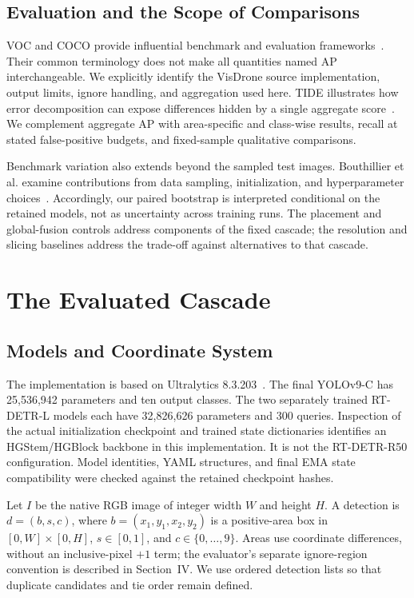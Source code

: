 \documentclass[journal]{IEEEtran}
\begin{document}
\subsection{Evaluation and the Scope of Comparisons}
VOC and COCO provide influential benchmark and evaluation frameworks~\cite{everingham2010voc,lin2014coco}. Their common terminology does not make all quantities named AP interchangeable. We explicitly identify the VisDrone source implementation, output limits, ignore handling, and aggregation used here. TIDE illustrates how error decomposition can expose differences hidden by a single aggregate score~\cite{bolya2020tide}. We complement aggregate AP with area-specific and class-wise results, recall at stated false-positive budgets, and fixed-sample qualitative comparisons.

Benchmark variation also extends beyond the sampled test images. Bouthillier et al. examine contributions from data sampling, initialization, and hyperparameter choices~\cite{bouthillier2021variance}. Accordingly, our paired bootstrap is interpreted conditional on the retained models, not as uncertainty across training runs. The placement and global-fusion controls address components of the fixed cascade; the resolution and slicing baselines address the trade-off against alternatives to that cascade.

\section{The Evaluated Cascade}
\subsection{Models and Coordinate System}
The implementation is based on Ultralytics 8.3.203~\cite{ultralytics2025}. The final YOLOv9-C has 25,536,942 parameters and ten output classes. The two separately trained RT-DETR-L models each have 32,826,626 parameters and 300 queries. Inspection of the actual initialization checkpoint and trained state dictionaries identifies an HGStem/HGBlock backbone in this implementation. It is not the RT-DETR-R50 configuration. Model identities, YAML structures, and final EMA state compatibility were checked against the retained checkpoint hashes.

Let $I$ be the native RGB image of integer width $W$ and height $H$. A detection is $d=(b,s,c)$, where $b=(x_1,y_1,x_2,y_2)$ is a positive-area box in $[0,W]\times[0,H]$, $s\in[0,1]$, and $c\in\{0,\ldots,9\}$. Areas use coordinate differences, without an inclusive-pixel $+1$ term; the evaluator's separate ignore-region convention is described in Section~IV. We use ordered detection lists so that duplicate candidates and tie order remain defined.
\end{document}
